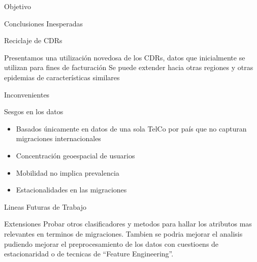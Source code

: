 \documentclass[xcolor=x11names]{beamer}
\begin{document}
\begin{frame}{Objetivo}
\begin{frame}{Conclusiones Inesperadas}
\end{frame}


\begin{frame}{Reciclaje de CDRs}

	    Presentamos una utilizaci\'on novedosa de los CDRs, datos que inicialmente se utilizan para fines de facturación
		\medskip
		Se puede extender hacia otras regiones y otras epidemias de características similares
		\medskip

\end{frame}


\begin{frame}{Inconvenientes}

		\begin{block}{Sesgos en los datos}
			\begin{itemize}
			\item Basados únicamente en datos de una sola TelCo por país que no capturan migraciones internacionales
			\item Concentración geoespacial de usuarios

			\item Mobilidad no implica prevalencia

			\item Estacionalidades en las migraciones

			\end{itemize}
 	 	\end{block}
\end{frame}



 \begin{frame}{Lineas Futuras de Trabajo}


	\begin{block}{Extensiones}
		Probar otros clasificadores y metodos para hallar los atributos mas relevantes en terminos de migraciones. Tambien se podria mejorar el analisis pudiendo mejorar el preprocesamiento de los datos con cuestioens de estacionaridad o de tecnicas de ``Feature Engineering''.
	\end{block}


\end{frame}
\end{frame}
\end{document}
